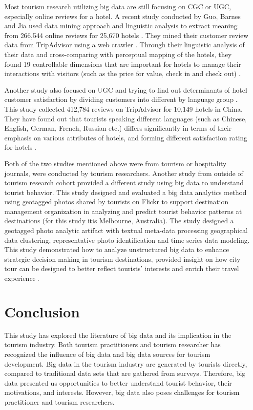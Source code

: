 \documentclass[sigconf]{acmart}
\begin{document}
Most tourism research utilizing big data are still focusing on CGC or UGC, especially
online reviews for a hotel. A recent study conducted by Guo, Barnes and Jia used data
mining approach and linguistic analysis to extract meaning from 266,544 online reviews
for 25,670 hotels \cite{GUO2017467}. They mined their customer review data from TripAdvisor
using a web crawler \cite{GUO2017467}. Through their linguistic analysis of their data 
and cross-comparing with perceptual mapping of the hotels, they found 19 controllable
dimensions that are important for hotels to manage their interactions with visitors
(such as the price for value, check in and check out) \cite{GUO2017467}.

Another study also focused on UGC and trying to find out determinants of hotel
customer satisfaction by dividing customers into different by language group 
\cite{LIU2017554}. This study collected 412,784 reviews on TripAdvisor for 10,149
hotels in China. They have found out that tourists speaking different languages (such 
as Chinese, English, German, French, Russian etc.) differs significantly in terms 
of their emphasis on various attributes of hotels, and forming different satisfaction
rating for hotels \cite{LIU2017554}.


Both of the two studies mentioned above were from tourism or hospitality journals,
were conducted by tourism researchers. Another study from outside of tourism research
cohort provided a different study using big data to understand tourist behavior. This
study designed and evaluated a big data analytics method using geotagged photos shared
by tourists on Flickr to support destination management organization in analyzing and
predict tourist behavior patterns at destinations (for this study itis Melbourne,
Australia). The study designed a geotagged photo analytic artifact with textual
meta-data processing geographical data clustering, representative photo identification
and time series data modeling. This study demonstrated how to analyze unstructured big
data to enhance strategic decision making in tourism destinations, provided insight on
how city tour can be designed to better reflect tourists' interests and enrich their
travel experience \cite{MIAH2017}. 


\section{Conclusion}
This study has explored the literature of big data and its implication in the tourism
industry. Both tourism practitioners and tourism researcher has recognized the
influence of big data and big data sources for tourism development. Big data in the
tourism industry are generated by tourists directly, compared to traditional data sets
that are gathered from surveys. Therefore, big data presented us opportunities to
better understand tourist behavior, their motivations, and interests. However, big
data also poses challenges for tourism practitioner and tourism researchers. 
\end{document}
